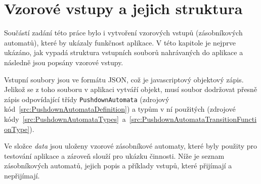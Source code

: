 \chapter{Vzorové vstupy a jejich struktura}\label{chap:Inputs}

Součástí zadání této práce bylo i vytvoření vzorových vstupů (zásobníkových automatů), které by ukázaly funkčnost aplikace. V této kapitole je nejprve ukázáno, jak vypadá struktura vstupních souborů nahrávaných do aplikace a následně jsou popsány vzorové vstupy.

Vstupní soubory jsou ve formátu JSON, což je javascriptový objektový zápis. Jelikož se z toho souboru v aplikaci vytváří objekt, musí soubor dodržovat přesně zápis odpovídající třídy \texttt{PushdownAutomata} (zdrojový kód~\ref{src:PushdownAutomataDefinition}) a typům v ní použitých (zdrojové kódy~\ref{src:PushdownAutomataTypes}~a~\ref{src:PushdownAutomataTransitionFunctionType}).

Ve složce \textit{data} jsou uloženy vzorové zásobníkové automaty, které byly použity pro testování aplikace a zároveň slouží pro ukázku činnosti. Níže je seznam zásobníkových automatů, jejich popis a příklady vstupů, které přijímají a nepřijímají.

